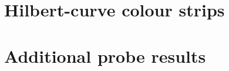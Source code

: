 \documentclass[11pt]{article}
\begin{document}




\appendix
\section{Hilbert-curve colour strips}

\section{Additional probe results}
\end{document}
